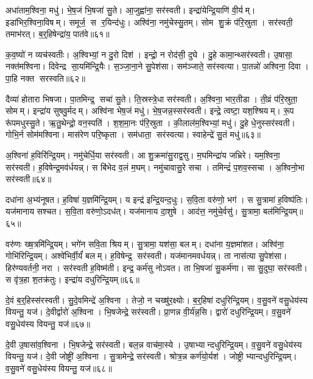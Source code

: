 अधा॑ताम॒श्विना॒ मधु॑। भे॒ष॒जं भि॒षजा॑ सु॒ते। आ॒जुह्वा॑ना॒ सर॑स्वती। इन्द्रा॑येन्द्रि॒याणि॑ वी॒र्यम्। इडा॑भिर॒श्विना॒विषम्। समूर्ज॒ स र॒यिन्द॑धुः। अश्वि॑ना॒ नमु॑चेस्सु॒तम्। सोम शु॒क्रं प॑रि॒स्रुता। सर॑स्वती॒ तमाभ॑रत्। ब॒र्॒हिषेन्द्रा॑य॒ पात॑वे॥६१॥

क॒व॒ष्यो॑ न व्यच॑स्वतीः। अ॒श्विभ्यां॒ न दु॒रो दिश॑। इन्द्रो॒ न रोद॑सी॒ दुघे। दु॒हे कामा॒न्थ्सर॑स्वती। उ॒षासा॒ नक्त॑मश्विना। दिवेन्द्र सा॒यमि॑न्द्रि॒यैः। स॒ञ्जा॒ना॒ने सु॒पेश॑सा। सम॑ञ्जाते॒ सर॑स्वत्या। पा॒तन्नो॑ अश्विना॒ दिवा। पा॒हि नक्त सरस्वति॥६२॥

दैव्या॑ होतारा भिषजा। पा॒तमिन्द्र॒ सचा॑ सु॒ते। ति॒स्रस्त्रे॒धा सर॑स्वती। अ॒श्विना॒ भार॒तीडा। ती॒व्रं प॑रि॒स्रुता॒ सोमम्। इन्द्रा॑य सुषवु॒र्मदम्। अश्वि॑ना भेष॒जं मधु॑। भे॒ष॒जन्न॒स्सर॑स्वती। इन्द्रे॒ त्वष्टा॒ यश॒श्श्रियम्। रू॒प रू॑पमधुस्सु॒ते। ऋ॒तु॒थेन्द्रो॒ वन॒स्पति॑। श॒श॒मा॒नः प॑रि॒स्रुता। की॒लाल॑म॒श्विभ्यां॒ मधु॑। दु॒हे धे॒नुस्सर॑स्वती। गोभि॒र्न सोम॑मश्विना। मास॑रेण परि॒ष्कृता। सम॑धाता॒ सर॑स्वत्या। स्वाहेन्द्रे॑ सु॒तं मधु॑॥६३॥\anuvakamend[न॒ग्नहु॒ पात॑वे सरस्वत्यधुस्सु॒तेऽष्टौ च॑]

अ॒श्विना॑ ह॒विरि॑न्द्रि॒यम्। नमु॑चेर्धि॒या सर॑स्वती। आ शु॒क्रमा॑सु॒राद्व॒सु। म॒घमिन्द्रा॑य जभ्रिरे। यम॒श्विना॒ सर॑स्वती। ह॒विषेन्द्र॒मव॑र्धयन्न्। स बि॑भेद व॒लं म॒घम्। नमु॑चावासु॒रे सचा। तमिन्द्रं॑ प॒शव॒स्सचा। अ॒श्विनो॒भा सर॑स्वती॥६४॥

दधा॑ना अ॒भ्य॑नूषत। ह॒विषा॑ य॒ज्ञमि॑न्द्रि॒यम्। य इन्द्र॑ इन्द्रि॒यन्द॒धुः। स॒वि॒ता वरु॑णो॒ भग॑। स सु॒त्रामा॑ ह॒विष्प॑तिः। यज॑मानाय सश्चत। स॒वि॒ता वरु॑णो॒ऽदध॑त्। यज॑मानाय दा॒शुषे। आद॑त्त॒ नमु॑चे॒र्वसु॑। सु॒त्रामा॒ बल॑मिन्द्रि॒यम्॥६५॥

वरु॑णः ख्ष॒त्रमि॑न्द्रि॒यम्। भगे॑न सवि॒ता श्रियम्। सु॒त्रामा॒ यश॑सा॒ बलम्। दधा॑ना य॒ज्ञमा॑शत। अश्वि॑ना॒ गोभि॑रिन्द्रि॒यम्। अश्वे॑भिर्वी॒र्यं॑ बलम्। ह॒विषेन्द्र॒ सर॑स्वती। यज॑मानमवर्धयन्न्। ता नास॑त्या सु॒पेश॑सा। हिर॑ण्यवर्तनी॒ नरा। सर॑स्वती ह॒विष्म॑ती। इन्द्र॒ कर्म॑सु नोऽवत। ता भि॒षजा॑ सु॒कर्म॑णा। सा सु॒दुघा॒ सर॑स्वती। स वृ॑त्र॒हा श॒तक्र॑तुः। इन्द्रा॑य दधुरिन्द्रि॒यम्॥६६॥\anuvakamend[उ॒भा सर॑स्वती॒ बल॑मिन्द्रि॒यन्नरा॒ षट्च॑]

दे॒वं ब॒र्॒हिस्स॑रस्वती। सु॒दे॒वमिन्द्रे॑ अ॒श्विना। तेजो॒ न चख्षु॑र॒क्ष्योः। ब॒र्॒हिषा॑ दधुरिन्द्रि॒यम्। व॒सु॒वने॑ वसु॒धेय॑स्य वियन्तु॒ यज॑। दे॒वीर्द्वारो॑ अ॒श्विना। भि॒षजेन्द्रे॒ सर॑स्वती। प्रा॒णन्न वी॒र्य॑न्न॒सि। द्वारो॑ दधुरिन्द्रि॒यम्। व॒सु॒वने॑ वसु॒धेय॑स्य वियन्तु॒ यज॑॥६७॥

दे॒वी उ॒षासा॑व॒श्विना। भि॒षजेन्द्रे॒ सर॑स्वती। बल॒न्न वाच॑मा॒स्ये। उ॒षाभ्यान्दधुरिन्द्रि॒यम्। व॒सु॒वने॑ वसु॒धेय॑स्य वियन्तु॒ यज॑। दे॒वी जोष्ट्री॑ अ॒श्विना। सु॒त्रामेन्द्रे॒ सर॑स्वती। श्रोत्र॒न्न कर्ण॑यो॒र्यश॑। जोष्ट्रीभ्यान्दधुरिन्द्रि॒यम्। व॒सु॒वने॑ वसु॒धेय॑स्य वियन्तु॒ यज॑॥६८॥

